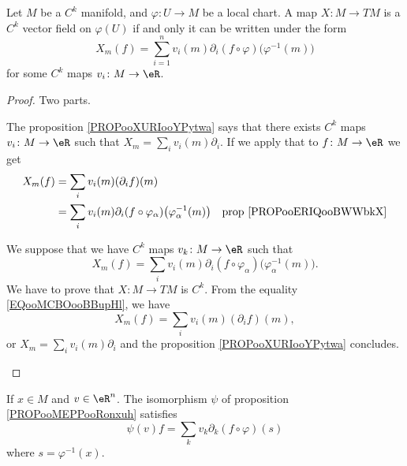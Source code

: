 \begin{lemma}        \label{LEMooZWFAooDlYaJm}
	Let \( M\) be a \( C^k\) manifold, and \( \varphi\colon U\to M\) be a local chart. A map \( X\colon M\to TM\) is a \( C^k\) vector field on \( \varphi(U)\) if and only it can be written under the form
	\begin{equation}
		X_m(f)=\sum_{i=1}^nv_i(m)\partial_i(f\circ\varphi)\big( \varphi^{-1}(m) \big)
	\end{equation}
	for some \( C^k\) maps \( v_i\colon M\to \eR\).
\end{lemma}

\begin{proof}
	Two parts.
	\begin{subproof}
		\spitem[\( \Rightarrow\)]
		The proposition \ref{PROPooXURIooYPytwa} says that there exists \( C^k\) maps \( v_i \colon M\to \eR   \) such that \( X_m=\sum_iv_i(m)\partial_i\). If we apply that to \(f \colon M\to \eR  \) we get
		\begin{subequations}
			\begin{align}
				X_m(f) & =\sum_iv_i(m)(\partial_if)(m)                                                                                              \\
				       & =\sum_iv_i(m)\partial_i(f\circ\varphi_{\alpha})\big( \varphi_{\alpha}^{-1}(m) \big) & \text{prop \ref{PROPooERIQooBWWbkX}}
			\end{align}
		\end{subequations}

		\spitem[\( \Leftarrow\)]
		We suppose that we have \( C^k\) maps \(v_k \colon M\to \eR  \) such that
		\begin{equation}
			X_m(f)=\sum_iv_i(m)\partial_i(f\circ\varphi_{\alpha})\big( \varphi_{\alpha}^{-1}(m) \big).
		\end{equation}
		We have to prove that \(X \colon M\to TM  \) is \( C^k\). From the equality \eqref{EQooMCBOooBBupHl}, we have
		\begin{equation}
			X_m(f)=\sum_iv_i(m)(\partial_if)(m),
		\end{equation}
		or \( X_m=\sum_iv_i(m)\partial_i\) and the proposition \ref{PROPooXURIooYPytwa} concludes.
	\end{subproof}
\end{proof}

\begin{lemma}       \label{LEMooIQZWooOSLNXB}
	If \( x\in M\) and \( v\in \eR^n\). The isomorphism \( \psi\) of proposition \ref{PROPooMEPPooRonxuh} satisfies
	\begin{equation}        \label{EQooBVOBooBTfYWC}
		\psi(v)f=\sum_kv_k\partial_k(f\circ\varphi)(s)
	\end{equation}
	where \( s=\varphi^{-1}(x)\).
\end{lemma}

